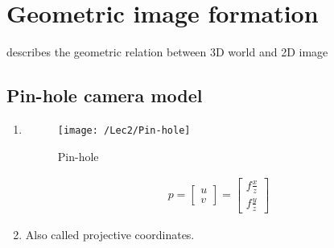 \section{Geometric image formation}
 describes the geometric relation between 3D world and 2D image

\subsection{Pin-hole camera model}
\begin{enumerate}
    \item {}
    \begin{figure}[H]
        \centering
        \texttt{[image: /Lec2/Pin-hole]}
        \caption{Pin-hole}
    \end{figure}
    \begin{align*}
        p=\begin{bmatrix}
            u\\v
        \end{bmatrix}=\begin{bmatrix}
            f\frac{x}{z}\\ f\frac{y}{z}
        \end{bmatrix}
    \end{align*}
    
    \item {}
    
    Also called projective coordinates.


\end{enumerate}
